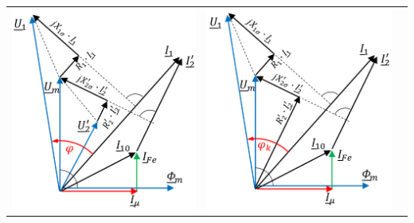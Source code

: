 \begin{tabular}{|l|l|l|}
\begin{minipage}{0.25\textwidth}
		\includegraphics[height=1.2\textwidth]{bilder/trafo_nennlast.png}
	\end{minipage} & 
	\begin{minipage}{0.25\textwidth}
		\includegraphics[height=1.2\textwidth]{bilder/trafo_kurz.png}

\end{minipage}
\end{tabular}
